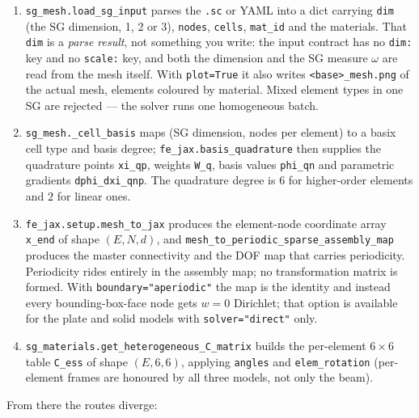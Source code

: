 \begin{enumerate}
\item \texttt{sg\_mesh.load\_sg\_input} parses the \texttt{.sc} or YAML into a
      dict carrying \texttt{dim} (the SG dimension, 1, 2 or 3), \texttt{nodes},
      \texttt{cells}, \texttt{mat\_id} and the materials. That \texttt{dim} is
      a \emph{parse result}, not something you write: the input contract has
      no \texttt{dim:} key and no \texttt{scale:} key, and both the dimension
      and the SG measure $\omega$ are read from the mesh itself. With
      \texttt{plot=True} it also writes \texttt{<base>\_mesh.png} of the actual
      mesh, elements coloured by material. Mixed element types in one SG are
      rejected --- the solver runs one homogeneous batch.
\item \texttt{sg\_mesh.\_cell\_basis} maps (SG dimension, nodes per element) to
      a basix cell type and basis degree; \texttt{fe\_jax.basis\_quadrature}
      then supplies the quadrature points \texttt{xi\_qp}, weights \texttt{W\_q},
      basis values \texttt{phi\_qn} and parametric gradients
      \texttt{dphi\_dxi\_qnp}. The quadrature degree is $6$ for higher-order
      elements and $2$ for linear ones.
\item \texttt{fe\_jax.setup.mesh\_to\_jax} produces the element-node coordinate
      array \texttt{x\_end} of shape $(E, N, d)$, and
      \texttt{mesh\_to\_periodic\_sparse\_assembly\_map} produces the master
      connectivity and the DOF map that carries periodicity. Periodicity rides
      entirely in the assembly map; no transformation matrix is formed. With
      \texttt{boundary="aperiodic"} the map is the identity and instead every
      bounding-box-face node gets $w=0$ Dirichlet; that option is available for
      the plate and solid models with \texttt{solver="direct"} only.
\item \texttt{sg\_materials.get\_heterogeneous\_C\_matrix} builds the per-element
      $6\times6$ table \texttt{C\_ess} of shape $(E,6,6)$, applying
      \texttt{angles} and \texttt{elem\_rotation} (per-element frames are
      honoured by all three models, not only the beam).
\end{enumerate}

\noindent
From there the routes diverge:

